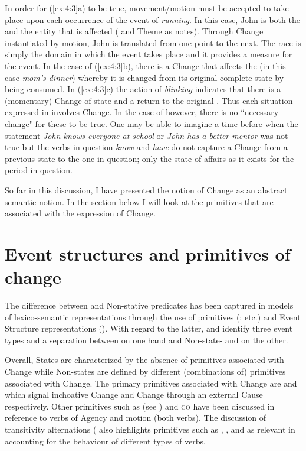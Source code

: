 In order for (\ref{ex:4:3}a) to be true, movement\slash motion must be
accepted to take place upon each occurrence of the event of \textit{running}.
In this case, John is both the  and the entity that is affected
( and Theme as \citet[28]{Pustejovsky1988} notes).  Through Change
instantiated by motion, John is translated from one point to the next.
The race is simply the domain in which the event takes place and it
provides a measure for the event.  In the case of (\ref{ex:4:3}b),
there is a Change that affects the  (in this case
\textit{mom’s dinner}) whereby it is changed from its original complete state
by being consumed.  In (\ref{ex:4:3}c) the action of \textit{blinking}
indicates that there is a (momentary) Change of state and a return to
the original .  Thus each situation expressed in 
involves Change.  In the case of  however, there is no
``necessary change" for these to be true.  One may be able to imagine a
time before when the statement \textit{John knows everyone at school} or
\textit{John has a better mentor} was not true but the verbs in question
\textit{know} and \textit{have} do not capture a Change from a previous state to the one in question; only the state of affairs as it exists for the period
in question.

So far in this discussion, I have presented the notion of Change as an
abstract semantic notion.  In the section below I will look at the
primitives that are associated with the expression of Change.

\section{Event structures and primitives of change}\label{sec:4.2}

The difference between  and Non-stative predicates has been
captured in models of lexico-semantic representations through the use
of primitives
(\citealt{McCawley1968,Carter1976,Dowty1979,Jackendoff1996}; etc.) and
Event Structure representations (\citealt{Pustejovsky1988,Pustejovsky1991,Grimshaw1990}).  With regard to the latter, \citet{Pustejovsky1988,Pustejovsky1991} and \citet{Grimshaw1990} identify three event types and a separation between  on one hand and Non-state- and  on the other.

Overall, States are characterized by the absence of primitives
associated with Change while Non-states are defined by different
(combinations of) primitives associated with Change.  The primary
primitives associated with Change are \BECOME and \CAUSE which signal
inchoative Change and Change through an external Cause respectively.
Other primitives such as \DO (see \citealt{Dowty1979}) and \textsc{go}
\citep{Jackendoff1996} have been discussed in reference to verbs of
Agency and motion (both  verbs). The discussion of transitivity
alternations (\citet{Levin1993} also highlights primitives such as
\MOTION, \CONTACT, and \CHANGEOFSTATE as relevant in accounting for the
behaviour of different types of verbs.

